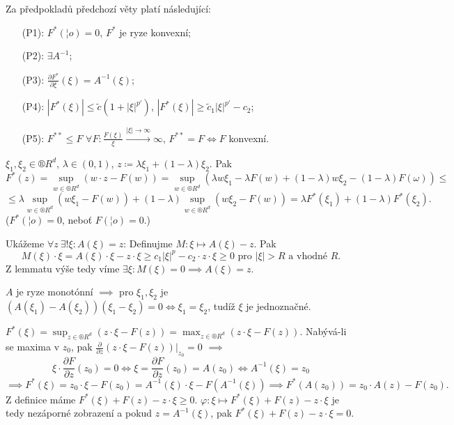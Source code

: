 \documentclass[12pt]{article}					%
\begin{document}
\begin{lemma}
	Za předpokladů předchozí věty platí následující:
	\begin{itemize}
		\item[(P1):] $F^*(¦o) = 0$, $F^*$ je ryze konvexní;
		\item[(P2):] $\exists A^{-1}$;
		\item[(P3):] $\frac{\partial F^*}{\partial ξ}(ξ) = A^{-1}(ξ)$;
		\item[(P4):] $|F^*(ξ)| ≤ \tilde c (1 + |ξ|^{p'})$, $|F^*(ξ)| ≥ \tilde c_1|ξ|^{p'} - c_2$;
		\item[(P5):] $F^{**} ≤ F$ $\forall F: \frac{F(ξ)}{ξ} \overset{|ξ| \rightarrow ∞}\longrightarrow ∞$, $F^{**} = F \Leftrightarrow F$ konvexní.
	\end{itemize}

	\begin{dukazin}[P1]
		$ξ_1, ξ_2 \in ®R^d$, $λ \in (0, 1)$, $z \coloneq λ ξ_1 + (1 - λ)ξ_2$. Pak
		$$ F^*(z) = \sup_{w \in ®R^d}(w·z - F(w)) = \sup_{w \in ®R^d} (λ w ξ_1 - λF(w) + (1 - λ)wξ_2 - (1 - λ)F(ω)) ≤ $$
		$$ ≤ λ\sup_{w \in ®R^d}(w ξ_1 - F(w)) + (1 - λ) \sup_{w \in ®R^d} (w ξ_2 - F(w)) = λ F^*(ξ_1) + (1 - λ) F^*(ξ_2). $$
		($F^*(¦o) = 0$, neboť $F(¦o) = 0$.)
	\end{dukazin}

	\begin{dukazin}[P2]
		Ukážeme $\forall z\ \exists! ξ: A(ξ) = z$: Definujme $M: ξ \mapsto A(ξ) - z$. Pak
		$$ M(ξ)·ξ = A(ξ)·ξ - z·ξ ≥ c_1 |ξ|^p - c_2·z·ξ ≥ 0 \text{ pro $|ξ| > R$ a vhodné $R$}. $$
		Z lemmatu výše tedy víme $\exists ξ: M(ξ) = 0 \implies A(ξ) = z$.

		$A$ je ryze monotónní $\implies$ pro $ξ_1, ξ_2$ je $(A(ξ_1) - A(ξ_2))(ξ_1 - ξ_2) = 0 \Leftrightarrow ξ_1 = ξ_2$, tudíž $ξ$ je jednoznačné.
	\end{dukazin}

	\begin{dukazin}[P3]
		$F^*(ξ) = \sup_{z \in ®R^d} (z·ξ - F(z)) = \max_{z \in ®R^d}(z·ξ - F(z))$. Nabývá-li se maxima v $z_0$, pak $\frac{\partial}{\partial z}(z·ξ - F(z))|_{z_0} = 0$ $\implies$
		$$ ξ·\frac{\partial F}{\partial z}(z_0) = 0 \Leftrightarrow ξ = \frac{\partial F}{\partial z}(z_0) = A(z_0) \Leftrightarrow A^{-1}(ξ) = z_0 $$
		$$ \implies F^*(ξ) = z_0·ξ - F(z_0) = A^{-1}(ξ)·ξ - F(A^{-1}(ξ)) \implies F^*(A(z_0)) = z_0·A(z) - F(z_0). $$
		Z definice máme $F^*(ξ) + F(z) - z·ξ ≥ 0$. $φ: ξ \mapsto F^*(ξ) + F(z) - z·ξ$ je tedy nezáporné zobrazení a pokud $z = A^{-1}(ξ)$, pak $F^*(ξ) + F(z) - z·ξ = 0$.


\end{dukazin}
\end{lemma}
\end{document}
